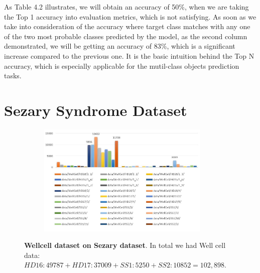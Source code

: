 As Table 4.2 illustrates, we will obtain an accuracy of 50\%, when we are taking the Top 1 accuracy into evaluation metrics, which is not satisfying. As soon as we take into consideration of the accuracy where target class matches with any one of the two most probable classes predicted by the model, as the second column demonstrated, we will be getting an accuracy of 83\%, which is a significant increase compared to the previous one. It is the basic intuition behind the Top N accuracy, which is especially applicable for the mutil-class objects prediction tasks.





\section{Sezary Syndrome Dataset}
\label{sec:lorem}

\begin{figure}[h]
	\begin{center}
		\begin{subfigure}[b]{\textwidth}
		    \centering
			\includegraphics[width=0.9\textwidth]{thesis-template-master/images/wellcellSezary dataset.JPG}
			\label{fig:cellnet}
		\end{subfigure}
	\end{center}
	\caption{\textbf{Wellcell dataset on Sezary dataset}. In total we had Well cell data:$HD16:49787+ HD17:37009+SS1:5250+SS2:10852= 102,898$.}
	\label{fig:4.2}
\end{figure}

